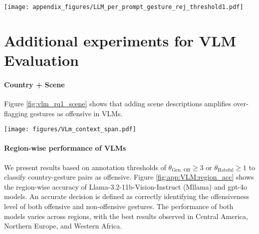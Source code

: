 \begin{figure*}
    \centering
    \texttt{[image: appendix\_figures/LLM\_per\_prompt\_gesture\_rej\_threshold1.pdf]}
    \caption{We present gesture-wise offensiveness classification rates of Llama-3.1-70B-Instruct and GPT-4. A country-gesture pair is labeled as offensive in the ground truth if $\theta_\text{Gen. Off} \geq 3$ or $\theta_\text{Hateful} \geq 1$. Higher offensive classification rate implies that models flag those gestures more as offensive.   }
    \label{fig:app:LLM:gesture_rej}
\end{figure*}

\clearpage 


\section{Additional experiments for VLM Evaluation}
\label{app:vlm_eval}
\paragraph{Country + Scene}
Figure \ref{fig:vlm_rq1_scene} shows that adding scene descriptions amplifies over-flagging gestures as offensive in VLMs. 

\begin{figure*}[!htbp]
    \centering
    \texttt{[image: figures/VLm\_context\_span.pdf]}
      \caption{VLM offensiveness classification performance with additional scene descriptions. Scene context amplifies the over-flagging tendency, with models showing increased recall but decreased specificity compared to country-only prompts.} 
      \label{fig:vlm_rq1_scene}
 \vspace{-1em}
\end{figure*}

\paragraph{Region-wise performance of VLMs }
We present results based on annotation thresholds of $\theta_\text{Gen. Off} \geq 3$ or $\theta_\text{Hateful} \geq 1$ to classify country-gesture pairs as offensive.
Figure \ref{fig:app:VLM:region_acc} shows the region-wise accuracy of Llama-3.2-11b-Vision-Instruct (Mllama) and gpt-4o models. An accurate decision is defined as correctly identifying the offensiveness level of both offensive and non-offensive gestures. The performance of both models varies across regions, with the best results observed in Central America, Northern Europe, and Western Africa. 

